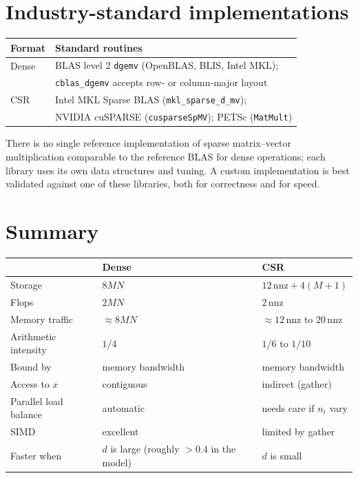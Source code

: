 \documentclass[11pt,a4paper]{article}
\newcommand{\nnz}{\mathrm{nnz}}
\begin{document}
\section{Industry-standard implementations}

\begin{center}
\begin{tabular}{ll}
\toprule
Format & Standard routines \\
\midrule
Dense & BLAS level 2 \texttt{dgemv} (OpenBLAS, BLIS, Intel MKL); \\
      & \texttt{cblas\_dgemv} accepts row- or column-major layout \\
CSR   & Intel MKL Sparse BLAS (\texttt{mkl\_sparse\_d\_mv}); \\
      & NVIDIA cuSPARSE (\texttt{cusparseSpMV}); PETSc (\texttt{MatMult}) \\
\bottomrule
\end{tabular}
\end{center}

\noindent There is no single reference implementation of sparse
matrix--vector multiplication comparable to the reference BLAS for dense
operations; each library uses its own data structures and tuning. A custom
implementation is best validated against one of these libraries, both for
correctness and for speed.

\section{Summary}

\begin{center}
\begin{tabular}{lll}
\toprule
 & Dense & CSR \\
\midrule
Storage & $8MN$ & $12\,\nnz + 4(M+1)$ \\
Flops & $2MN$ & $2\,\nnz$ \\
Memory traffic & $\approx 8MN$ & $\approx 12\,\nnz$ to $20\,\nnz$ \\
Arithmetic intensity & $1/4$ & $1/6$ to $1/10$ \\
Bound by & memory bandwidth & memory bandwidth \\
Access to $x$ & contiguous & indirect (gather) \\
Parallel load balance & automatic & needs care if $n_i$ vary \\
SIMD & excellent & limited by gather \\
Faster when & $d$ is large (roughly $> 0.4$ in the model) & $d$ is small \\
\bottomrule
\end{tabular}
\end{center}
\end{document}
